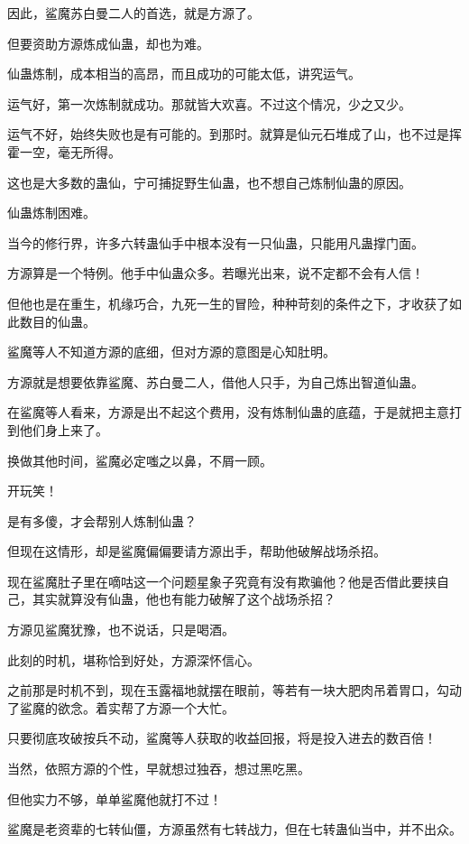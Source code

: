 \begin{this_body}
因此，鲨魔苏白曼二人的首选，就是方源了。

但要资助方源炼成仙蛊，却也为难。

仙蛊炼制，成本相当的高昂，而且成功的可能太低，讲究运气。

运气好，第一次炼制就成功。那就皆大欢喜。不过这个情况，少之又少。

运气不好，始终失败也是有可能的。到那时。就算是仙元石堆成了山，也不过是挥霍一空，毫无所得。

这也是大多数的蛊仙，宁可捕捉野生仙蛊，也不想自己炼制仙蛊的原因。

仙蛊炼制困难。

当今的修行界，许多六转蛊仙手中根本没有一只仙蛊，只能用凡蛊撑门面。

方源算是一个特例。他手中仙蛊众多。若曝光出来，说不定都不会有人信！

但他也是在重生，机缘巧合，九死一生的冒险，种种苛刻的条件之下，才收获了如此数目的仙蛊。

鲨魔等人不知道方源的底细，但对方源的意图是心知肚明。

方源就是想要依靠鲨魔、苏白曼二人，借他人只手，为自己炼出智道仙蛊。

在鲨魔等人看来，方源是出不起这个费用，没有炼制仙蛊的底蕴，于是就把主意打到他们身上来了。

换做其他时间，鲨魔必定嗤之以鼻，不屑一顾。

开玩笑！

是有多傻，才会帮别人炼制仙蛊？

但现在这情形，却是鲨魔偏偏要请方源出手，帮助他破解战场杀招。

现在鲨魔肚子里在嘀咕这一个问题星象子究竟有没有欺骗他？他是否借此要挟自己，其实就算没有仙蛊，他也有能力破解了这个战场杀招？

方源见鲨魔犹豫，也不说话，只是喝酒。

此刻的时机，堪称恰到好处，方源深怀信心。

之前那是时机不到，现在玉露福地就摆在眼前，等若有一块大肥肉吊着胃口，勾动了鲨魔的欲念。着实帮了方源一个大忙。

只要彻底攻破按兵不动，鲨魔等人获取的收益回报，将是投入进去的数百倍！

当然，依照方源的个性，早就想过独吞，想过黑吃黑。

但他实力不够，单单鲨魔他就打不过！

鲨魔是老资辈的七转仙僵，方源虽然有七转战力，但在七转蛊仙当中，并不出众。


\end{this_body}
